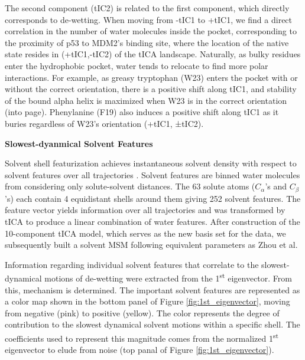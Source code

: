 The second component (tIC2) is related to the first component, which directly corresponds to de-wetting. When moving from -tIC1 to +tIC1, we find a
direct correlation in the number of water molecules inside the pocket, corresponding to the proximity of p53 to MDM2's binding site, where the location of the native state resides in (+tIC1,-tIC2) of the tICA landscape. Naturally, as bulky residues enter the hydrophobic pocket, water tends to relocate to find more polar interactions. For example, as greasy tryptophan (W23) enters the pocket with or without the correct orientation, there is a positive shift along tIC1, and stability of the bound alpha helix is maximized when W23 is in the correct orientation (into page). Phenylanine (F19) also induces a positive shift along tIC1 as it buries regardless of W23's orientation (+tIC1, ±tIC2).

\textbf{Slowest-dyanmical Solvent Features}

Solvent shell featurization achieves instantaneous solvent density with
respect to solvent features over all trajectories \cite{harrigan2015conserve}. Solvent features are binned water molecules from considering only solute-solvent distances. The 63 solute atoms ($C_{\alpha}$'s and $C_{\beta}$'s) each contain 4 equidistant shells around them giving 252 solvent features.
The feature vector yields information over all trajectories and was transformed by tICA to produce a linear combination of water features. After construction of the 10-component tICA model, which serves as the new basis set for the data, we subsequently built a
solvent MSM following equivalent parameters as Zhou et al.

Information regarding individual solvent features that correlate to the slowest-dynamical motions of de-wetting were extracted from the 1\textsuperscript{st} eigenvector. From this, mechanism is determined.  The important solvent features are represented as a color map shown in the bottom panel of Figure \ref{fig:1st_eigenvector}, moving from negative (pink) to positive (yellow).  The color represents the degree of contribution to the slowest dynamical solvent motions within a specific shell. The coefficients used to represent this magnitude comes from the normalized 1\textsuperscript{st} eigenvector to elude from noise (top panal of Figure \ref{fig:1st_eigenvector}).


